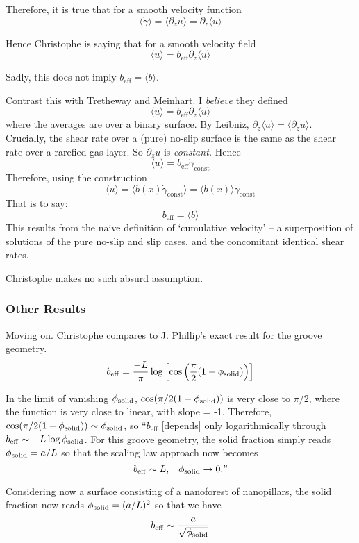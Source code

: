 \documentclass{article}
\newcommand{\beff}{\ensuremath{b_{\mathrm{eff}}}}
\begin{document}
Therefore, it is true that for a smooth velocity function
\[ \langle \dot{\gamma} \rangle = \langle \partial_z u \rangle =
\partial_z \langle u \rangle \]

Hence Christophe is saying that for a smooth velocity field
\[ \langle u \rangle = \beff \partial_z \langle u \rangle \]

Sadly, this does not imply $\beff = \langle b \rangle $.

\vspace*{1em}
Contrast this with Tretheway and Meinhart.  I \emph{believe} they defined 
\[ \langle u \rangle = \beff \partial_z \langle u \rangle \] where the averages are over a binary surface.  By Leibniz, $\partial_z \langle u \rangle =  
\langle \partial_z u \rangle$.  Crucially, the shear rate over a (pure) no-slip surface is the same as the shear rate over a rarefied gas layer.  So $\partial_z u$ is \emph{constant.} Hence
\[ \langle u \rangle = \beff \dot{\gamma}_{\mathrm{const}} \]
Therefore, using the construction
\[ \langle u \rangle = \langle b(x) \dot{\gamma}_{\mathrm{const}} \rangle 
= \langle b(x) \rangle \dot{\gamma}_{\mathrm{const}} \]
That is to say:
\[ \beff = \langle b \rangle \]
This results from the naive definition of `cumulative velocity' -- a superposition of solutions of the pure no-slip and slip cases, and the concomitant identical shear rates.

Christophe makes no such absurd assumption.


\subsubsection*{Other Results}

Moving on.  Christophe compares to J. Phillip's exact result for the groove geometry.
\[ \beff = \frac{-L}{\pi} \log \left[ \cos \left( \frac{\pi}{2} (  1-\phisol) \right) \right] \]

In the limit of vanishing $\phi_{\mathrm{solid}}$, $\cos(\pi/2 ( 1- \phi_{\mathrm{solid}})) $ is very close to $\pi/2$, where the function is very close to linear, with slope = -1.  Therefore, 
$\cos(\pi/2 ( 1- \phi_{\mathrm{solid}})) \sim \phi_{\mathrm{solid}} $, so ``$\beff$ [depends] only logarithmically through $\beff \sim -L \log \phisol $.  For this groove geometry, the solid fraction simply reads $\phi_{\mathrm{solid}} = a/L$ so that the scaling law approach now becomes
\[ \beff \sim L,\;\;\;{\phisol \rightarrow 0}." \]

Considering now a surface consisting of a nanoforest of nanopillars, the solid fraction now reads $\phi_{\mathrm{solid}} = (a/L)^2$ so that we have
\[ \beff \sim \frac{a}{ \sqrt{\phisol} } \]
\end{document}
